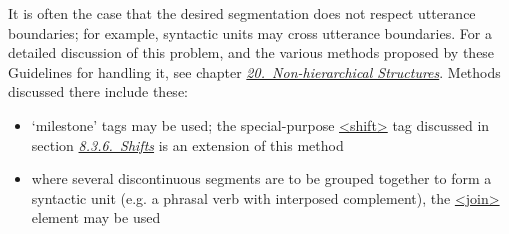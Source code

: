 It is often the case that the desired segmentation does not respect utterance boundaries; for example, syntactic units may cross utterance boundaries. For a detailed discussion of this problem, and the various methods proposed by these Guidelines for handling it, see chapter \textit{\hyperref[NH]{20.\ Non-hierarchical Structures}}. Methods discussed there include these: \begin{itemize}
\item ‘milestone’ tags may be used; the special-purpose \hyperref[TEI.shift]{<shift>} tag discussed in section \textit{\hyperref[TSSASH]{8.3.6.\ Shifts}} is an extension of this method
\item where several discontinuous segments are to be grouped together to form a syntactic unit (e.g. a phrasal verb with interposed complement), the \hyperref[TEI.join]{<join>} element may be used
\end{itemize} 
